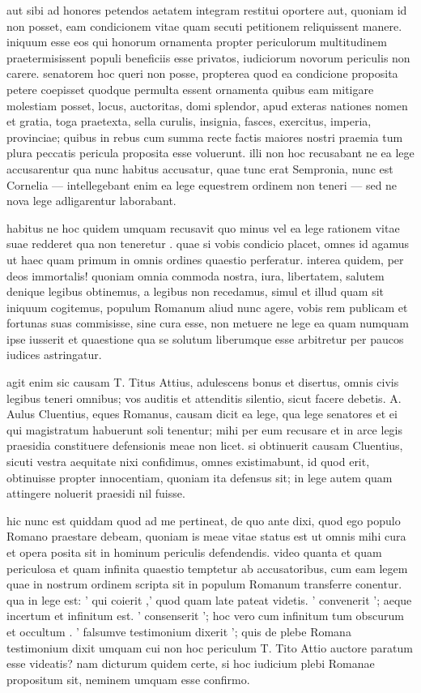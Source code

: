  aut sibi ad honores petendos aetatem integram restitui oportere aut, quoniam id non posset, eam condicionem vitae quam secuti petitionem reliquissent manere. iniquum esse eos qui honorum ornamenta propter periculorum multitudinem praetermisissent populi beneficiis esse privatos, iudiciorum novorum periculis non carere. senatorem hoc queri non posse, propterea quod ea condicione proposita petere coepisset quodque permulta essent ornamenta quibus eam mitigare molestiam posset, locus, auctoritas, domi splendor, apud exteras nationes nomen et gratia, toga praetexta, sella curulis, insignia, fasces, exercitus, imperia, provinciae; quibus in rebus cum summa recte factis maiores nostri praemia tum plura peccatis pericula proposita esse voluerunt. illi non hoc recusabant ne ea lege accusarentur qua nunc habitus accusatur, quae tunc erat Sempronia, nunc est Cornelia — intellegebant enim ea lege equestrem ordinem non teneri — sed ne nova lege adligarentur laborabant.

 habitus ne hoc quidem umquam recusavit quo minus vel ea lege rationem vitae suae redderet qua non teneretur . quae si vobis condicio placet, omnes id agamus ut haec quam primum in omnis ordines quaestio perferatur. interea quidem, per deos immortalis! quoniam omnia commoda nostra, iura, libertatem, salutem denique legibus obtinemus, a legibus non recedamus, simul et illud quam sit iniquum cogitemus, populum Romanum aliud nunc agere, vobis rem publicam et fortunas suas commisisse, sine cura esse, non metuere ne lege ea quam numquam ipse iusserit et quaestione qua se solutum liberumque esse arbitretur per paucos iudices astringatur.

 agit enim sic causam T. Titus Attius, adulescens bonus et disertus, omnis civis legibus teneri omnibus; vos auditis et attenditis silentio, sicut facere debetis. A. Aulus Cluentius, eques Romanus, causam dicit ea lege, qua lege senatores et ei qui magistratum habuerunt soli tenentur; mihi per eum recusare et in arce legis praesidia constituere defensionis meae non licet. si obtinuerit causam Cluentius, sicuti vestra aequitate nixi confidimus, omnes existimabunt, id quod erit, obtinuisse propter innocentiam, quoniam ita defensus sit; in lege autem quam attingere noluerit praesidi nil fuisse.

 hic nunc est quiddam quod ad me pertineat, de quo ante dixi, quod ego populo Romano praestare debeam, quoniam is meae vitae status est ut omnis mihi cura et opera posita sit in hominum periculis defendendis. video quanta et quam periculosa et quam infinita quaestio temptetur ab accusatoribus, cum eam legem quae in nostrum ordinem scripta sit in populum Romanum transferre conentur. qua in lege est: ' qui coierit ,' quod quam late pateat videtis. ' convenerit '; aeque incertum et infinitum est. ' consenserit '; hoc vero cum infinitum tum obscurum et occultum . ' falsumve testimonium dixerit '; quis de plebe Romana testimonium dixit umquam cui non hoc periculum T. Tito Attio auctore paratum esse videatis? nam dicturum quidem certe, si hoc iudicium plebi Romanae propositum sit, neminem umquam esse confirmo.

